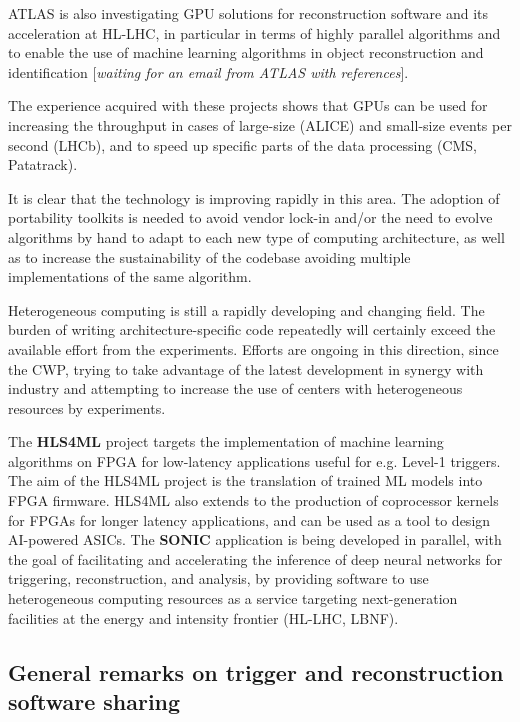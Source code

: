 ATLAS is also investigating GPU solutions for reconstruction software
and its acceleration at HL-LHC, in particular in terms of highly
parallel algorithms \cite{attila_krasznahorkay_2019_3599103} and to enable the use of machine learning
algorithms in object reconstruction and identification {[}\emph{waiting
for an email from ATLAS with references}{]}.

The experience acquired with these projects shows that GPUs can be used
for increasing the throughput in cases of large-size (ALICE) \cite{david_rohr_2019_3599418} and small-size events per second (LHCb), and to speed up
specific parts of the data processing (CMS, Patatrack).

It is clear that the technology is improving rapidly in this area. The
adoption of portability toolkits is needed to avoid vendor lock-in
and/or the need to evolve algorithms by hand to adapt to each new type
of computing architecture, as well as to increase the sustainability of
the codebase avoiding multiple implementations of the same algorithm.

Heterogeneous computing is still a rapidly developing and changing
field. The burden of writing architecture-specific code repeatedly will
certainly exceed the available effort from the experiments. Efforts are
ongoing in this direction, since the CWP, trying to take advantage of
the latest development in synergy with industry and attempting to
increase the use of centers with heterogeneous resources by experiments.

The \textbf{HLS4ML} project \cite{Duarte:2018ite,Summers:2020xiy,DiGuglielmo:2020eqx} targets the implementation of
machine learning algorithms on FPGA for low-latency applications useful
for e.g. Level-1 triggers. The aim of the HLS4ML project is the
translation of trained ML models into FPGA firmware. HLS4ML also extends
to the production of coprocessor kernels for FPGAs for longer latency
applications, and can be used as a tool to design AI-powered ASICs. The
\textbf{SONIC} application \cite{Duarte:2019fta} is being developed in parallel, with
the goal of facilitating and accelerating the inference of deep neural
networks for triggering, reconstruction, and analysis, by providing
software to use heterogeneous computing resources as a service targeting
next-generation facilities at the energy and intensity frontier (HL-LHC,
LBNF).

\hypertarget{general-remarks-on-trigger-and-reconstruction-software-sharing}{%
\subsection{General remarks on trigger and reconstruction software
sharing}\label{general-remarks-on-trigger-and-reconstruction-software-sharing}}

